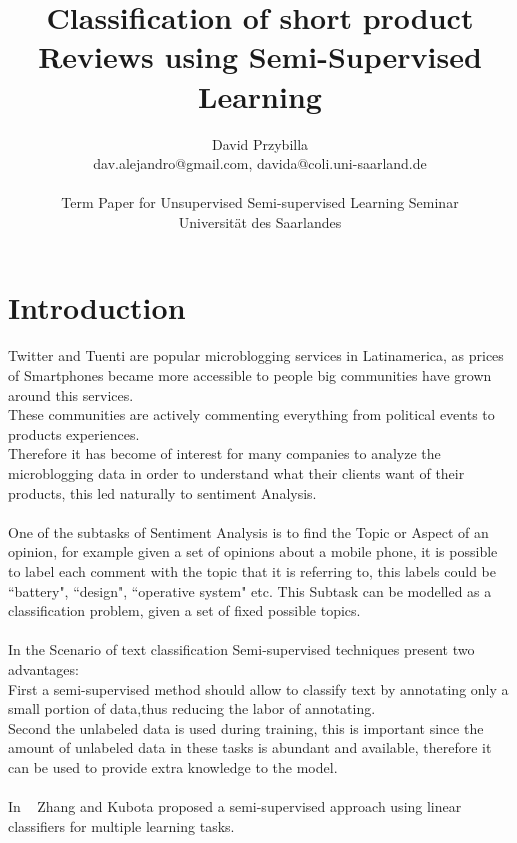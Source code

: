 \documentclass[4pt,a4paper,twocolumn]{article}
\author{David Przybilla\\dav.alejandro@gmail.com, davida@coli.uni-saarland.de\\ \\ Term Paper for Unsupervised Semi-supervised
Learning Seminar\\ Universit\"{a}t des Saarlandes}
\title{Classification of short product Reviews using Semi-Supervised Learning}
\begin{document}
\twocolumn[
	 \begin{@twocolumnfalse}
    \maketitle
   \begin{abstract}
      ...
    \end{abstract}
  \end{@twocolumnfalse}
 ]



\section{Introduction}
Twitter and Tuenti are popular microblogging services in Latinamerica,
as prices of Smartphones became more accessible to people big communities
have grown around this services.\\
These communities are actively commenting everything from political events to products experiences.\\
Therefore it has become of interest for many companies to analyze the microblogging data in order to understand
what their clients want of their products, this led naturally to sentiment Analysis.\\ 
\\
One of the subtasks of Sentiment Analysis is to find the Topic or Aspect of an opinion,
for example given a set of opinions about a mobile phone, it is possible to label each comment
with the topic that it is referring to, this labels could be ``battery", ``design", ``operative system" etc.
This Subtask can be modelled as a classification problem, given a set of fixed possible topics.\\
\\
In the Scenario of text classification Semi-supervised techniques present two advantages:\\
First a semi-supervised method should allow to classify text by annotating only a small portion of data,thus reducing the labor of annotating.\\
Second the unlabeled data is used during training, this is important since the amount of unlabeled data in these tasks is abundant and available, therefore it can be used to provide extra knowledge to the model.\\
\\
In ~\cite{Ando:2005:FLP:1046920.1194905} Zhang and Kubota proposed a semi-supervised approach using linear classifiers for multiple learning tasks.\\
\end{document}
